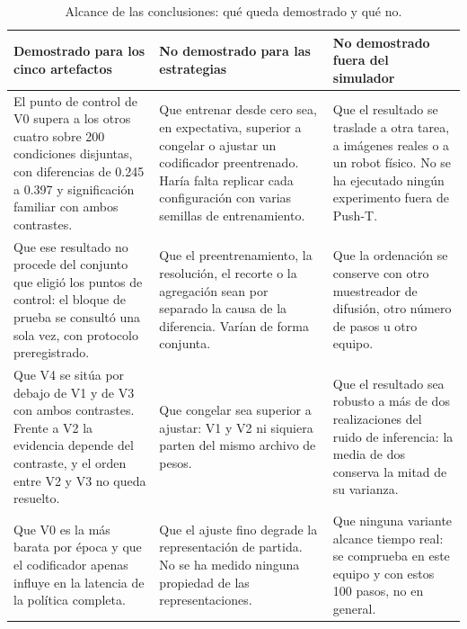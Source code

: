 \begin{table}[htbp]
  \centering
  \caption{Alcance de las conclusiones: qu\'e queda demostrado y qu\'e no.}
  \label{tab:alcance}
  \scriptsize
  \begin{tabular}{p{}p{}p{}}
    \toprule
    Demostrado para los cinco artefactos &
    No demostrado para las estrategias &
    No demostrado fuera del simulador \\
    \midrule
    El punto de control de V0 supera a los otros cuatro sobre \num{200} condiciones
      disjuntas, con diferencias de \num{0.245} a \num{0.397} y significaci\'on familiar
      con ambos contrastes. &
    Que entrenar desde cero sea, en expectativa, superior a congelar o ajustar un
      codificador preentrenado. Har\'ia falta replicar cada configuraci\'on con varias
      semillas de entrenamiento. &
    Que el resultado se traslade a otra tarea, a im\'agenes reales o a un robot f\'isico.
      No se ha ejecutado ning\'un experimento fuera de Push-T. \\
    \addlinespace
    Que ese resultado no procede del conjunto que eligi\'o los puntos de control: el bloque
      de prueba se consult\'o una sola vez, con protocolo preregistrado. &
    Que el preentrenamiento, la resoluci\'on, el recorte o la agregaci\'on sean por
      separado la causa de la diferencia. Var\'ian de forma conjunta. &
    Que la ordenaci\'on se conserve con otro muestreador de difusi\'on, otro n\'umero de
      pasos u otro equipo. \\
    \addlinespace
    Que V4 se sit\'ua por debajo de V1 y de V3 con ambos contrastes. Frente a V2 la
      evidencia depende del contraste, y el orden entre V2 y V3 no queda resuelto. &
    Que congelar sea superior a ajustar: V1 y V2 ni siquiera parten del mismo archivo de
      pesos. &
    Que el resultado sea robusto a m\'as de dos realizaciones del ruido de inferencia: la
      media de dos conserva la mitad de su varianza. \\
    \addlinespace
    Que V0 es la m\'as barata por \'epoca y que el codificador apenas influye en la
      latencia de la pol\'itica completa. &
    Que el ajuste fino degrade la representaci\'on de partida. No se ha medido ninguna
      propiedad de las representaciones. &
    Que ninguna variante alcance tiempo real: se comprueba en este equipo y con estos
      \num{100} pasos, no en general. \\
    \bottomrule
  \end{tabular}
\end{table}

